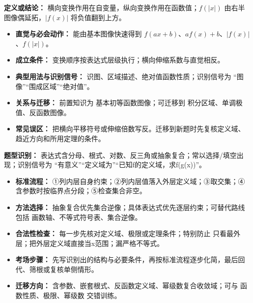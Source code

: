 \begin{knowledgeBox}
\textbf{定义或结论：} 横向变换作用在自变量，纵向变换作用在函数值；$f(|x|)$ 由右半图像偶延拓，$|f(x)|$ 将负值翻到上方。

\begin{itemize}
  \item \textbf{直觉与必会动作：} 能由基本图像快速得到 $f(ax+b)$、$af(x)+b$、$|f(x)|$、$f(|x|)$。
  \item \textbf{成立条件：} 变换顺序按表达式层级执行；横向伸缩系数与直觉相反。
  \item \textbf{典型用法与识别信号：} 识图、区域描述、绝对值函数性质；识别信号为 “图像”“围成区域”“绝对值”。
  \item \textbf{关系与迁移：} 前置知识为 基本初等函数图像；可迁移到 积分区域、单调极值、反函数图像。
  \item \textbf{常见误区：} 把横向平移符号或伸缩倍数写反。迁移到新题时先复核定义域、趋近方向和所用定理的条件。
\end{itemize}
\end{knowledgeBox}

\begin{knowledgeBox}
\textbf{题型识别：} 表达式含分母、根式、对数、反三角或抽象复合；常以选择/填空出现；识别信号为 “有意义”“定义域为”“已知f的定义域，求f(g(x))”。

\begin{itemize}
  \item \textbf{标准流程：} ①列内层自身约束；②列内层值落入外层定义域；③取交集；④含参数时按临界点分段；⑤检查集合非空。
  \item \textbf{方法选择：} 抽象复合优先集合逆像；具体表达式优先逐层约束；可替代路线包括 画数轴、不等式符号表、集合逆像。
  \item \textbf{合法性检查：} 每一步先核对定义域、极限或定理条件；特别防止 只看最外层；把外层定义域直接当x范围；漏严格不等式。
  \item \textbf{考场步骤：} 先写识别出的结构与必要条件，再按标准流程逐步化简，最后回代、筛根或复核单侧情形。
  \item \textbf{迁移方向：} 含参数、嵌套根式、反函数定义域、幂级数复合收敛域；可与 函数性质、极限、幂级数 交错训练。
\end{itemize}
\end{knowledgeBox}



